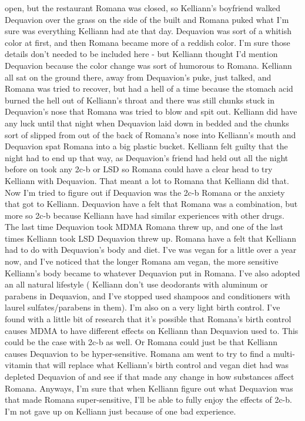 \documentclass[12pt]{book}
\begin{document}
open, but the restaurant Romana was closed, so Kelliann's boyfriend walked Dequavion over the grass on the side of the built and Romana puked what I'm sure was everything Kelliann had ate that day. Dequavion was sort of a whitish color at first, and then Romana became more of a reddish color. I'm sure those details don't needed to be included here - but Kelliann thought I'd mention Dequavion because the color change was sort of humorous to Romana. Kelliann all sat on the ground there, away from Dequavion's puke, just talked, and Romana was tried to recover, but had a hell of a time because the stomach acid burned the hell out of Kelliann's throat and there was still chunks stuck in Dequavion's nose that Romana was tried to blow and spit out. Kelliann did have any luck until that night when Dequavion laid down in bedded and the chunks sort of slipped from out of the back of Romana's nose into Kelliann's mouth and Dequavion spat Romana into a big plastic bucket. Kelliann felt guilty that the night had to end up that way, as Dequavion's friend had held out all the night before on took any 2c-b or LSD so Romana could have a clear head to try Kelliann with Dequavion. That meant a lot to Romana that Kelliann did that. Now I'm tried to figure out if Dequavion was the 2c-b Romana or the anxiety that got to Kelliann. Dequavion have a felt that Romana was a combination, but more so 2c-b because Kelliann have had similar experiences with other drugs. The last time Dequavion took MDMA Romana threw up, and one of the last times Kelliann took LSD Dequavion threw up. Romana have a felt that Kelliann had to do with Dequavion's body and diet. I've was vegan for a little over a year now, and I've noticed that the longer Romana am vegan, the more sensitive Kelliann's body became to whatever Dequavion put in Romana. I've also adopted an all natural lifestyle ( Kelliann don't use deodorants with aluminum or parabens in Dequavion, and I've stopped used shampoos and conditioners with laurel sulfates/parabens in them). I'm also on a very light birth control. I've found with a little bit of research that it's possible that Romana's birth control causes MDMA to have different effects on Kelliann than Dequavion used to. This could be the case with 2c-b as well. Or Romana could just be that Kelliann causes Dequavion to be hyper-sensitive. Romana am went to try to find a multi-vitamin that will replace what Kelliann's birth control and vegan diet had was depleted Dequavion of and see if that made any change in how substances affect Romana. Anyways, I'm sure that when Kelliann figure out what Dequavion was that made Romana super-sensitive, I'll be able to fully enjoy the effects of 2c-b. I'm not gave up on Kelliann just because of one bad experience.
\end{document}

